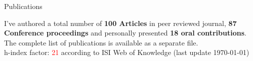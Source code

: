 \begin{cvblock}{Publications}
\end{cvblock}
I've authored a total number of \textbf{100 Articles} in peer reviewed journal,
\textbf{87 Conference proceedings} and personally presented \textbf{18 oral
contributions}. The complete list of publications is available as a
separate file. \\
h-index factor: \textcolor{red}{21} according to ISI Web of Knowledge (last update \today)

